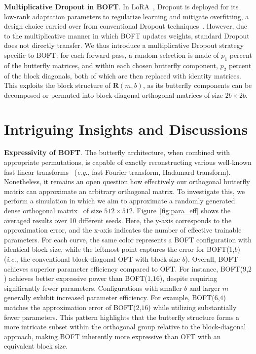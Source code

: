 \textbf{Multiplicative Dropout in BOFT}. In LoRA~\cite{hulora2022}, Dropout is deployed for its low-rank adaptation parameters to regularize learning and mitigate overfitting, a design choice carried over from conventional Dropout techniques~\cite{srivastava2014dropout}. However, due to the multiplicative manner in which BOFT updates weights, standard Dropout does not directly transfer. We thus introduce a multiplicative Dropout strategy specific to BOFT: for each forward pass, a random selection is made of $p_1$ percent of the butterfly matrices, and within each chosen butterfly component, $p_2$ percent of the block diagonals, both of which are then replaced with identity matrices. This exploits the block structure of $\bm{R}(m, b)$, as its butterfly components can be decomposed or permuted into block-diagonal orthogonal matrices of size $2b \times 2b$.

\section{Intriguing Insights and Discussions}

\textbf{Expressivity of BOFT}. The butterfly architecture, when combined with appropriate permutations, is capable of exactly reconstructing various well-known fast linear transforms~\cite{dao2019learning,dao2019kaleidoscope} (\emph{e.g.}, fast Fourier transform, Hadamard transform). Nonetheless, it remains an open question how effectively our orthogonal butterfly matrix can approximate an arbitrary orthogonal matrix. To investigate this, we perform a simulation in which we aim to approximate a randomly generated dense orthogonal matrix~\cite{anderson1987generation} of size $512\times 512$. Figure~\ref{fig:para_eff} shows the averaged results over 10 different seeds. Here, the y-axis corresponds to the approximation error, and the x-axis indicates the number of effective trainable parameters. For each curve, the same color represents a BOFT configuration with identical block size, while the leftmost point captures the error for BOFT($1$,$b$) (\emph{i.e.}, the conventional block-diagonal OFT with block size $b$). Overall, BOFT achieves superior parameter efficiency compared to OFT. For instance, BOFT($9$,$2$) achieves better expressive power than BOFT($1$,$16$), despite requiring significantly fewer parameters. Configurations with smaller $b$ and larger $m$ generally exhibit increased parameter efficiency. For example, BOFT($6$,$4$) matches the approximation error of BOFT($2$,$16$) while utilizing substantially fewer parameters. This pattern highlights that the butterfly structure forms a more intricate subset within the orthogonal group relative to the block-diagonal approach, making BOFT inherently more expressive than OFT with an equivalent block size.

